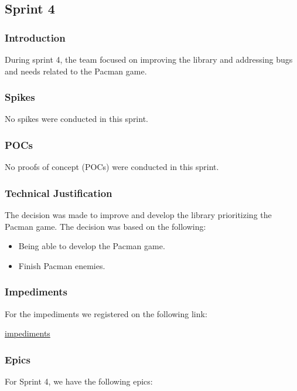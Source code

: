 \subsection{Sprint 4}

\subsubsection{Introduction}
During sprint 4, the team focused on improving the library and addressing bugs and needs related to the Pacman game.

\subsubsection{Spikes}

No spikes were conducted in this sprint.

\subsubsection{POCs}

No proofs of concept (POCs) were conducted in this sprint.

\subsubsection{Technical Justification}
The decision was made to improve and develop the library prioritizing the Pacman game. The decision was based on the following:

\begin{itemize}
    \item Being able to develop the Pacman game.
    \item Finish Pacman enemies.
\end{itemize}


\subsubsection{Impediments}
For the impediments we registered on the following link:

\href{https://docs.google.com/spreadsheets/d/1v_3SvV4162Al9MyRWZ77Oe7ui-eKSd0T5Xl1QH822uc/edit?gid=0#gid=0}{impediments}

\subsubsection{Epics}

For Sprint 4, we have the following epics:

